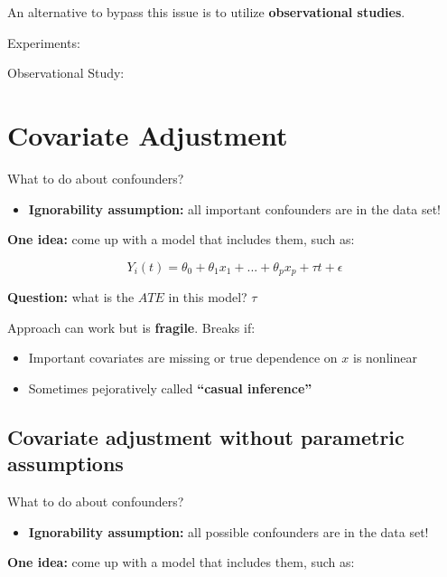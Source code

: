 \documentclass[
  letterpaper,
  DIV=11,
  numbers=noendperiod]{scrreprt}
\providecommand{\tightlist}{%
  \setlength{\itemsep}{0pt}\setlength{\parskip}{0pt}}\usepackage{longtable,booktabs,array}
\begin{document}
An alternative to bypass this issue is to utilize \textbf{observational
studies}.

Experiments:

Observational Study:

\hypertarget{covariate-adjustment}{%
\section{Covariate Adjustment}\label{covariate-adjustment}}

What to do about confounders?

\begin{itemize}
\tightlist
\item
  \textbf{Ignorability assumption:} all important confounders are in the
  data set!
\end{itemize}

\textbf{One idea:} come up with a model that includes them, such as:

\[Y_{i}(t) = \theta_{0} + \theta_{1}x_{1} + ... + \theta_{p}x_{p} + \tau{t} + \epsilon\]

\textbf{Question:} what is the \(ATE\) in this model? \(\tau\)

Approach can work but is \textbf{fragile}. Breaks if:

\begin{itemize}
\tightlist
\item
  Important covariates are missing or true dependence on \(x\) is
  nonlinear
\item
  Sometimes pejoratively called \textbf{``casual inference''}
\end{itemize}

\hypertarget{covariate-adjustment-without-parametric-assumptions}{%
\subsection{Covariate adjustment without parametric
assumptions}\label{covariate-adjustment-without-parametric-assumptions}}

What to do about confounders?

\begin{itemize}
\tightlist
\item
  \textbf{Ignorability assumption:} all possible confounders are in the
  data set!
\end{itemize}

\textbf{One idea:} come up with a model that includes them, such as:
\end{document}
